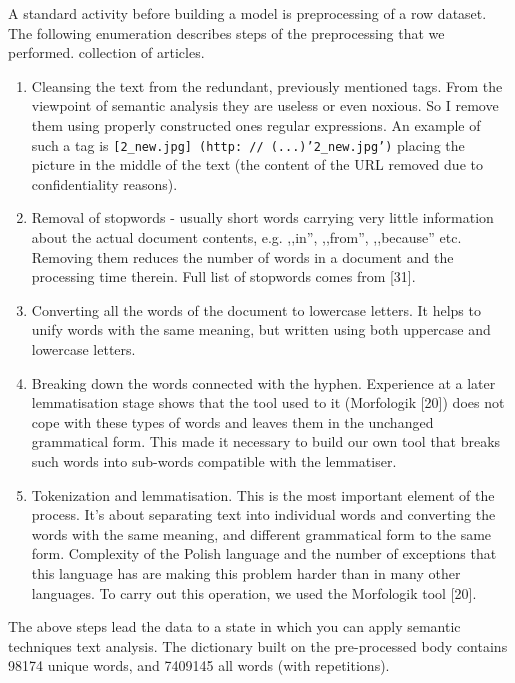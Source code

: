 \documentclass[twoside,twocolumn]{article}
\begin{document}
	A standard activity before building a model is preprocessing of a row dataset. The following enumeration describes steps of the preprocessing that we performed.
	collection of articles.
	\begin{enumerate}
		
		\item Cleansing the text from the redundant, previously mentioned tags. From the viewpoint of semantic analysis they are useless or even noxious. So I remove them using properly constructed ones
		regular expressions. An example of such a tag is \texttt{[2\_new.jpg] (http: // (...)'2\_new.jpg')} placing the picture in the middle of the text (the content of the URL removed due to confidentiality reasons).
		
		\item Removal of stopwords - usually short words carrying very little information about the actual document contents, e.g. ,,in'', ,,from'', ,,because'' etc. Removing them reduces the number of words in a document and the processing time therein. Full list of stopwords comes from [31].
		
		\item Converting all the words of the document to lowercase letters. It helps to unify words with the same meaning, but written using both uppercase and lowercase letters.
		
		\item Breaking down the words connected with the hyphen. Experience at a later lemmatisation stage shows that the tool used to it (Morfologik [20]) does not cope with these types of words and leaves them in the unchanged grammatical form. This made it necessary to build our own tool that breaks such words into sub-words compatible with the lemmatiser.
		
		\item Tokenization and lemmatisation. This is the most important element of the process. It's about separating text into individual words and converting the words with the same meaning, and different grammatical form to the same form. Complexity of the Polish language and the number of exceptions that this language has are making this problem harder than in many other languages. To carry out this operation, we used the Morfologik tool [20].
	
	\end{enumerate}
	
	The above steps lead the data to a state in which you can apply semantic techniques
	text analysis. The dictionary built on the pre-processed body contains 98174 unique
	words, and 7409145 all words (with repetitions).
	
\end{document}
